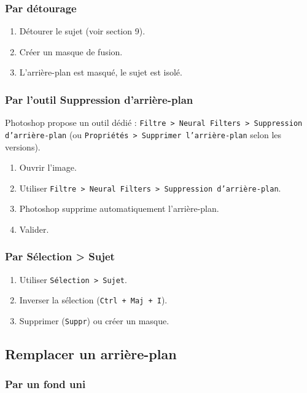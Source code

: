 \subsubsection{Par détourage}

\begin{enumerate}
    \item Détourer le sujet (voir section 9).
    \item Créer un masque de fusion.
    \item L'arrière-plan est masqué, le sujet est isolé.
\end{enumerate}

\subsubsection{Par l'outil Suppression d'arrière-plan}

Photoshop propose un outil dédié : \texttt{Filtre > Neural Filters > Suppression d'arrière-plan} (ou \texttt{Propriétés > Supprimer l'arrière-plan} selon les versions).

\begin{enumerate}
    \item Ouvrir l'image.
    \item Utiliser \texttt{Filtre > Neural Filters > Suppression d'arrière-plan}.
    \item Photoshop supprime automatiquement l'arrière-plan.
    \item Valider.
\end{enumerate}

\subsubsection{Par Sélection > Sujet}

\begin{enumerate}
    \item Utiliser \texttt{Sélection > Sujet}.
    \item Inverser la sélection (\texttt{Ctrl + Maj + I}).
    \item Supprimer (\texttt{Suppr}) ou créer un masque.
\end{enumerate}

\subsection{Remplacer un arrière-plan}

\subsubsection{Par un fond uni}

